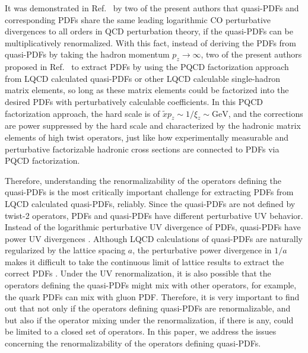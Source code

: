 \documentclass[twocolumn,aps,prd,superscriptaddress,nofootinbib,showpacs]{revtex4}
\begin{document}
It was demonstrated in Ref.~\cite{Ma:2014jla} by two of the present authors that quasi-PDFs and corresponding PDFs share the same leading logarithmic CO perturbative divergences to all orders in QCD perturbation theory, if the quasi-PDFs can be multiplicatively renormalized.  With this fact, instead of deriving the PDFs from quasi-PDFs by taking the hadron momentum $p_z\to\infty$, two of the present authors proposed in Ref.~\cite{Ma:2014jla} to extract PDFs by using the PQCD factorization approach from LQCD calculated quasi-PDFs or other LQCD calculable single-hadron matrix elements, so long as these matrix elements could be factorized into the desired PDFs with perturbatively calculable coefficients.  In this PQCD factorization approach, the hard scale is of $\tilde{x}p_z \sim 1/\xi_z \sim \text{GeV}$, and the corrections are power suppressed by the hard scale and characterized by the hadronic matrix elements of high twist operators, just like how experimentally measurable and perturbative factorizable hadronic cross sections are connected to PDFs via PQCD factorization.

Therefore, understanding the renormalizability of the operators defining the quasi-PDFs is the most critically important challenge for extracting PDFs from LQCD calculated quasi-PDFs, reliably.  Since the quasi-PDFs are not defined by twist-2 operators, PDFs and quasi-PDFs have different perturbative UV behavior.  Instead of the logarithmic perturbative UV divergence of PDFs, quasi-PDFs have power UV divergences \cite{Ma:2014jla,Xiong:2013bka}.  Although LQCD calculations of quasi-PDFs are naturally regularized by the lattice spacing $a$, the perturbative power divergence in $1/a$ makes it difficult to take the continuous limit of lattice results to extract the correct PDFs \cite{Ishikawa:2016znu,Chen:2016fxx,Monahan:2016bvm,Alexandrou:2017huk, Chen:2017mzz}.  Under the UV renormalization, it is also possible that the operators defining the quasi-PDFs might mix with other operators, for example, the quark PDFs can mix with gluon PDF.  Therefore, it is very important to find out that not only if the operators defining quasi-PDFs are renormalizable, and but also if the operator mixing under the renormalization, if there is any, could be limited to a closed set of operators.  In this paper, we address the issues concerning the renormalizability of the operators defining quasi-PDFs.
\end{document}
